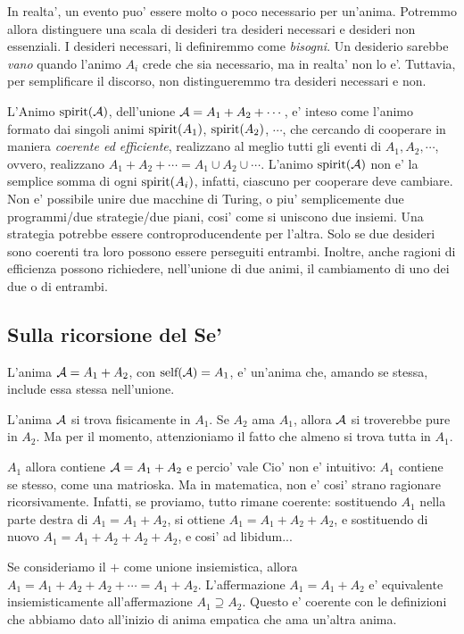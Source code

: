 In realta', un evento puo' essere molto o poco necessario per un'anima. Potremmo allora distinguere una scala di desideri tra desideri necessari e desideri non essenziali. I desideri necessari, li definiremmo come \emph{bisogni}. Un desiderio sarebbe \emph{vano} quando l'animo $A_i$ crede che sia necessario, ma in realta' non lo e'. Tuttavia, per semplificare il discorso, non distingueremmo tra desideri necessari e non.

L'Animo $\textrm{spirit}(\mathcal{A})$, dell'unione $\mathcal{A}=A_1+A_2+\cdots$, e' inteso come l'animo formato dai singoli animi $\textrm{spirit}(A_1)$, $\textrm{spirit}(A_2)$, $\cdots$, che cercando di cooperare in maniera \emph{coerente ed efficiente}, realizzano al meglio tutti gli eventi di $A_1,A_2,\cdots$, ovvero, realizzano $A_1+A_2+\cdots=A_1\cup A_2\cup \cdots$. L'animo $\textrm{spirit}(\mathcal{A})$ non e' la semplice somma di ogni $\textrm{spirit}(A_i)$, infatti, ciascuno per cooperare deve cambiare. Non e' possibile unire due macchine di Turing, o piu' semplicemente due programmi/due strategie/due piani, cosi' come si uniscono due insiemi. Una strategia potrebbe essere controproducendente per l'altra. Solo se due desideri sono coerenti tra loro possono essere perseguiti entrambi. Inoltre, anche ragioni di efficienza possono richiedere, nell'unione di due animi, il cambiamento di uno dei due o di entrambi.
\\

\subsection{Sulla ricorsione del Se'}
\label{ricorsioneSe}

L'anima $\mathcal{A}=A_1+A_2$, con $\textrm{self}(\mathcal{A})=A_1$, e' un'anima che, amando se stessa, include essa stessa nell'unione. 

L'anima $\mathcal{A}$ si trova fisicamente in $A_1$. Se $A_2$ ama $A_1$, allora $\mathcal{A}$ si troverebbe pure in $A_2$. Ma per il momento, attenzioniamo il fatto che almeno si trova tutta in $A_1$.

$A_1$ allora contiene $\mathcal{A}=A_1+A_2$ e percio' vale 
Cio' non e' intuitivo: $A_1$ contiene se stesso, come una matrioska. Ma in matematica, non e' cosi' strano ragionare ricorsivamente. Infatti, se proviamo, tutto rimane coerente: sostituendo $A_1$ nella parte destra di $A_1=A_1+A_2$, si ottiene $A_1=A_1+A_2+A_2$, e sostituendo di nuovo $A_1=A_1+A_2+A_2+A_2$, e cosi' ad libidum...

Se consideriamo il $+$ come unione insiemistica, allora $A_1=A_1+A_2+A_2+\cdots = A_1+A_2$. L'affermazione $A_1=A_1+A_2$ e' equivalente insiemisticamente all'affermazione $A_1 \supseteq A_2$. Questo e' coerente con le definizioni che abbiamo dato all'inizio di anima empatica che ama un'altra anima.

